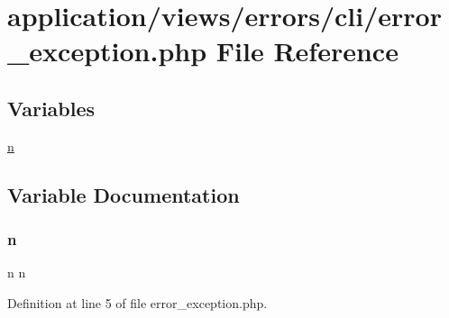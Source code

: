 \hypertarget{cli_2error__exception_8php}{}\section{application/views/errors/cli/error\+\_\+exception.php File Reference}
\label{cli_2error__exception_8php}
\subsection*{Variables}
\begin{DoxyCompactItemize}
\item 
\mbox{\hyperlink{cli_2error__exception_8php_a2e6b16bbc42094e4c51ade3c10afdcf1}{n}}
\end{DoxyCompactItemize}


\subsection{Variable Documentation}
\mbox{\label{cli_2error__exception_8php_a2e6b16bbc42094e4c51ade3c10afdcf1}} 
\subsubsection{\texorpdfstring{n}{n}}
{\footnotesize\ttfamily n n}



Definition at line 5 of file error\+\_\+exception.\+php.

